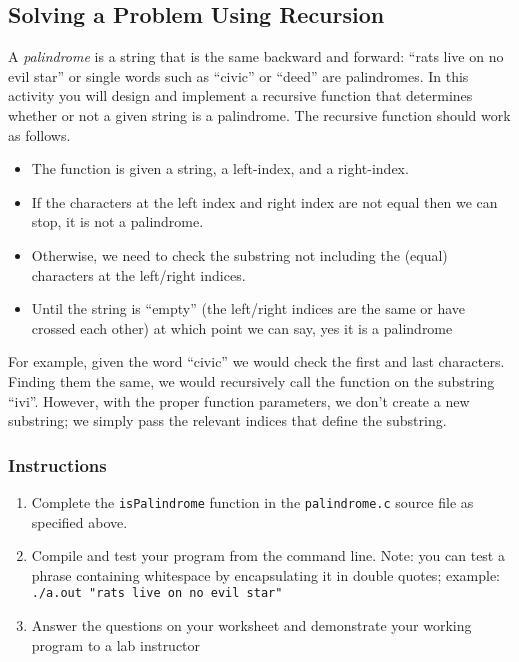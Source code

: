 \documentclass[12pt]{scrartcl}
\begin{document}
\subsection{Solving a Problem Using Recursion}

A \emph{palindrome} is a string that is the same backward and 
forward: ``rats live on no evil star'' or single words such as ``civic'' 
or ``deed'' are palindromes.  In this activity you will design and 
implement a recursive function that determines whether or not 
a given string is a palindrome.  The recursive function should 
work as follows.  
\begin{itemize}
  \item The function is given a string, a left-index, and a right-index.
  \item If the characters at the left index and right index are not 
	equal then we can stop, it is not a palindrome.
  \item Otherwise, we need to check the substring not including the 
	(equal) characters at the left/right indices.
  \item Until the string is ``empty'' (the left/right indices are the same 
	or have crossed each other) at which point we can say, yes it 
	is a palindrome
\end{itemize}

For example, given the word ``civic'' we would check the first and 
last characters.  Finding them the same, we would recursively call 
the function on the substring ``ivi''.  However, with the proper function 
parameters, we don't create a new substring; we simply pass the 
relevant indices that define the substring.

\subsubsection*{Instructions}

\begin{enumerate}
  \item Complete the \texttt{isPalindrome} function in the 
	\texttt{palindrome.c} source file as specified above.
  \item Compile and test your program from the command line.  
	Note: you can test a phrase containing whitespace by encapsulating 
	it in double quotes; example: \\
	\texttt{./a.out "rats live on no evil star"}
  \item Answer the questions on your worksheet and demonstrate your 
  	working program to a lab instructor
\end{enumerate}
	
\end{document}
